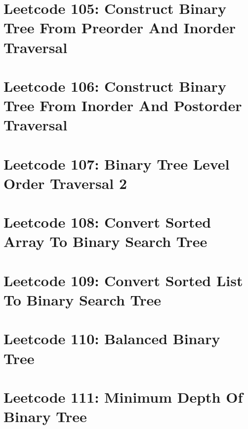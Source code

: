 \documentclass{article}
\begin{document}
\section*{Leetcode 105: Construct Binary Tree From Preorder And Inorder Traversal}

\pagebreak 

\section*{Leetcode 106: Construct Binary Tree From Inorder And Postorder Traversal}

\pagebreak 

\section*{Leetcode 107: Binary Tree Level Order Traversal 2}

\pagebreak 

\section*{Leetcode 108: Convert Sorted Array To Binary Search Tree}

\pagebreak 

\section*{Leetcode 109: Convert Sorted List To Binary Search Tree}

\pagebreak 

\section*{Leetcode 110: Balanced Binary Tree}

\pagebreak 

\section*{Leetcode 111: Minimum Depth Of Binary Tree}

\pagebreak 
\end{document}
